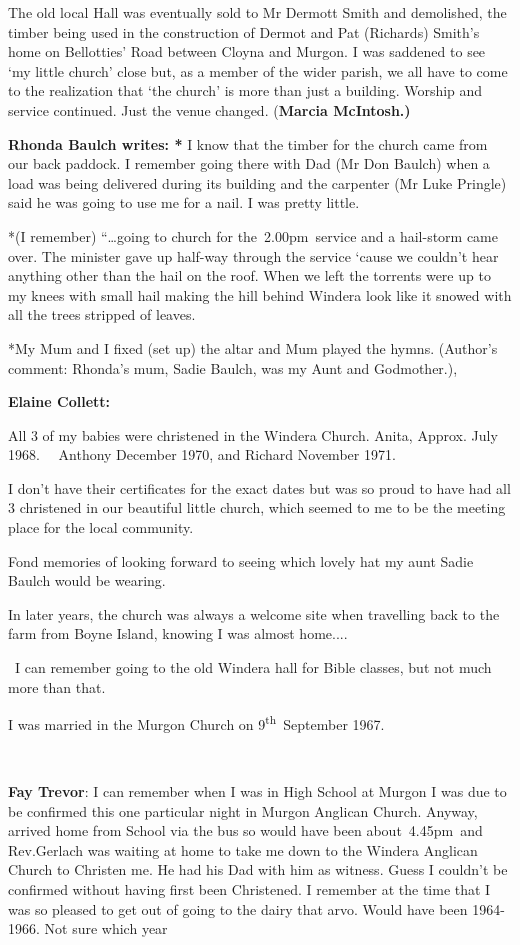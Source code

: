 The old local Hall was eventually sold to Mr Dermott Smith and
demolished, the timber being used in the construction of Dermot and Pat
(Richards) Smith's home on Bellotties' Road between Cloyna and Murgon. I
was saddened to see `my little church' close but, as a member of the
wider parish, we all have to come to the realization that `the church'
is more than just a building. Worship and service continued. Just the
venue changed. (\textbf{Marcia McIntosh.)}

\textbf{Rhonda Baulch writes: *} I know that the timber for the church
came from our back paddock. I remember going there with Dad (Mr Don
Baulch) when a load was being delivered during its building and the
carpenter (Mr Luke Pringle) said he was going to use me for a nail. I
was pretty little.

*(I remember) ``\ldots going to church for the~2.00pm~service and a
hail-storm came over. The minister gave up half-way through the service
`cause we couldn't hear anything other than the hail on the roof. When
we left the torrents were up to my knees with small hail making the hill
behind Windera look like it snowed with all the trees stripped of
leaves.

*My Mum and I fixed (set up) the altar and Mum played the hymns.
(Author's comment: Rhonda's mum, Sadie Baulch, was my Aunt and
Godmother.),

\textbf{Elaine Collett:}

All 3 of my babies were christened in the Windera Church. Anita, Approx.
July 1968.~~ Anthony December 1970, and Richard November 1971.

I don't have their certificates for the exact dates but was so proud to
have had all 3 christened in our beautiful little church, which seemed
to me to be the meeting place for the local community.

Fond memories of looking forward to seeing which lovely hat my aunt
Sadie Baulch would be wearing.

In later years, the church was always a welcome site when travelling
back to the farm from Boyne Island, knowing I was almost home....

~I can remember going to the old Windera hall for Bible classes, but not
much more than that.

I was married in the Murgon Church on 9\textsuperscript{th}~September
1967.

~

\textbf{Fay Trevor}: I can remember when I was in High School at Murgon
I was due to be confirmed this one particular night in Murgon Anglican
Church. Anyway, arrived home from School via the bus so would have been
about~4.45pm~and Rev.Gerlach was waiting at home to take me down to the
Windera Anglican Church to Christen me. He had his Dad with him as
witness. Guess I couldn't be confirmed without having first been
Christened. I remember at the time that I was so pleased to get out of
going to the dairy that arvo. Would have been 1964-1966. Not sure which
year

